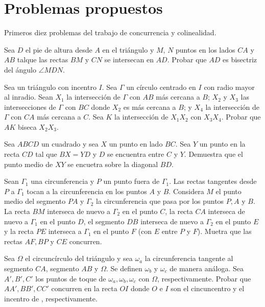 \section{Problemas propuestos}

Primeros diez problemas del trabajo de concurrencia y colinealidad.

\begin{section-problem}
    Sea $D$ el pie de altura desde $A$ en el triángulo  y $M$, $N$ puntos en los lados $CA$ y $AB$ talque las rectas $BM$ y $CN$ se intersecan en $AD$.
    Probar que $AD$ es bisectriz del ángulo $\angle MDN$.
\end{section-problem}

\begin{section-problem}
Sea  un triángulo con incentro $I$.
Sea $\Gamma$ un círculo centrado en $I$ con radio mayor al inradio.
Sean $X_1$ la intersección de $\Gamma$ con $AB$ más cercana a $B$; $X_2$ y $X_3$ las intersecciones de $\Gamma$ con $BC$ donde $X_2$ es más cercana a $B$; y $X_4$ la intersección de $\Gamma$ con $CA$ más cercana a $C$.
Sea $K$ la intersección de $X_1 X_2$ con $X_3 X_4$.
Probar que $AK$ biseca $X_2 X_3$.
\end{section-problem}

\begin{section-problem}
    Sea $ABCD$ un cuadrado y sea $X$ un punto en lado $BC$.
    Sea $Y$ un punto en la recta $CD$ tal que $BX = YD$ y $D$ se encuentra entre $C$ y $Y$.
    Demuestra que el punto medio de $XY$ se encuetra sobre la diagonal $BD$.
\end{section-problem}

\begin{section-problem}
Sean $\Gamma_1$ una circunferencia y $P$ un punto fuera de $\Gamma_1$.
Las rectas tangentes desde $P$ a $\Gamma_1$ tocan a la circunferencia en los puntos $A$ y $B$.
Considera $M$ el punto medio del segmento $PA$ y $\Gamma_2$ la circunferencia que pasa por los puntos $P, A$ y $B$.
La recta $BM$ interseca de nuevo a $\Gamma_2$ en el punto $C$, la recta $CA$ interseca de nuevo a $\Gamma_1$ en el punto $D$, el segmento $DB$ interseca de nuevo a $\Gamma_2$ en el punto $E$ y la recta $PE$ interseca a $\Gamma_1$ en el punto $F$ (con $E$ entre $P$ y $F$).
Muetra que las rectas $AF, BP$ y $CE$ concurren.
\end{section-problem}

\begin{section-problem}
Sea $\Omega$ el circuncírculo del triángulo  y sea $\omega_a$ la circunferencia tangente al segmento $CA$, segmento $AB$ y $\Omega$.
Se definen $\omega_b$ y $\omega_c$ de manera análoga.
Sea $A', B', C'$ los puntos de toque de $\omega_a, \omega_b, \omega_c$ con $\Omega$, respectivamente.
Probar que $AA', BB', CC'$ concurren en la recta $OI$ donde $O$ e $I$ son el cincuncentro y el incentro de , respectivamente.
\end{section-problem}

